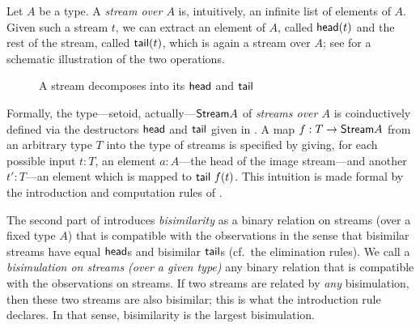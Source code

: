 \documentclass[a4paper,USenglish]{lipics}
\begin{document}
\begin{ex}
 \label{ex_stream}
  Let $A$ be a type. A \emph{stream over $A$} is, intuitively, an infinite list of elements of $A$. 
  Given such a stream $t$, we can extract an element of $A$, called $\mathsf{head}(t)$ and the rest of the stream, called $\mathsf{tail}(t)$, which is again a stream over $A$; see  for a schematic illustration of the two operations.
  \begin{figure}[htb]
    \centering
   \caption{A stream decomposes into its $\mathsf{head}$ and $\mathsf{tail}$} \label{fig:stream}
  \end{figure}
  Formally, the type---setoid, actually---$\mathsf{Stream} A$ of \emph{streams over $A$} is coinductively defined via the destructors $\mathsf{head}$ and $\mathsf{tail}$
  given in .  A map $f:T\to \mathsf{Stream} A$ from an arbitrary type $T$ into the type of streams is specified by giving, for each possible input $t:T$, 
  an element $a:A$---the head of the image stream---and another $t':T$---an element which is mapped to $\mathsf{tail}~f(t)$. This intuition is made formal by the 
  introduction and computation rules of .
  
  The second part of  introduces \emph{bisimilarity} as a binary relation on streams (over a fixed type $A$) that is compatible with the observations
  in the sense that bisimilar streams have equal $\mathsf{head}$s and bisimilar $\mathsf{tail}$s (cf.\ the elimination rules). 
  We call a \emph{bisimulation on streams (over a given type)} any binary relation that is compatible with the observations on streams.
  If two streams are related by \emph{any} bisimulation,
  then these two streams are also bisimilar; this is what the introduction rule declares. In that sense, bisimilarity is the largest bisimulation.
  

\end{ex}
\end{document}

